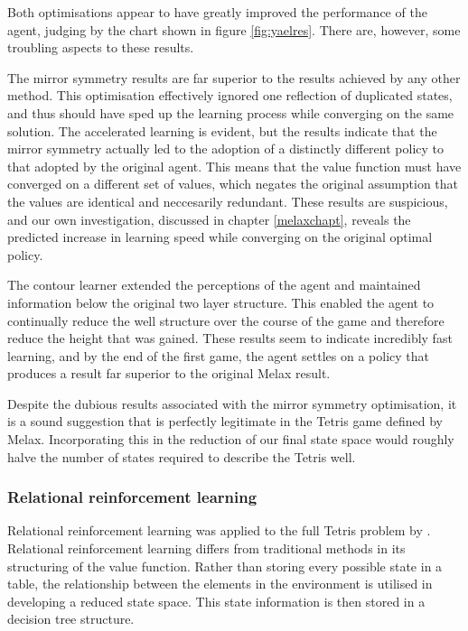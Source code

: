 \documentclass{rucsthesis}
\begin{document}
Both optimisations appear to have greatly improved the performance of the agent, judging by the chart shown in figure \ref{fig:yaelres}. There are, however, some troubling aspects to these results.

The mirror symmetry results are far superior to the results achieved by any other method. This optimisation effectively ignored one reflection of duplicated states, and thus should have sped up the learning process while converging on the same solution. The accelerated learning is evident, but the results indicate that the mirror symmetry actually led to the adoption of a distinctly different policy to that adopted by the original agent. This means that the value function must have converged on a different set of values, which negates the original assumption that the values are identical and neccesarily redundant. These results are suspicious, and our own investigation, discussed in chapter \ref{melaxchapt}, reveals the predicted increase in learning speed while converging on the original optimal policy.

The contour learner extended the perceptions of the agent and maintained information below the original two layer structure. This enabled the agent to continually reduce the well structure over the course of the game and therefore reduce the height that was gained. These results seem to indicate incredibly fast learning, and by the end of the first game, the agent settles on a policy that produces a result far superior to the original Melax result.

Despite the dubious results associated with the mirror symmetry optimisation, it is a sound suggestion that is perfectly legitimate in the Tetris game defined by Melax. Incorporating this in the reduction of our final state space would roughly halve the number of states required to describe the Tetris well.

\subsubsection{Relational reinforcement learning}

Relational reinforcement learning was applied to the full Tetris problem by \cite{kurt}. Relational reinforcement learning differs from traditional methods in its structuring of the value function. Rather than storing every possible state in a table, the relationship between the elements in the environment is utilised in developing a reduced state space. This state information is then stored in a decision tree structure. 
\end{document}
